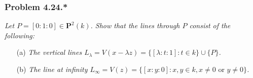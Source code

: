 \documentclass{article}
\begin{document}
\subsubsection*{Problem 4.24.*}
\emph{Let $P = [0 : 1 : 0] \in \mathbf{P}^{2}(k)$.
Show that the lines through $P$ consist of the following:}
\begin{enumerate}
\item[(a)]
  \emph{The vertical lines
  $L_{\lambda} = V(x-\lambda z) = \{ [\lambda:t:1] : t \in k \} \cup \{ P \}$.}

\item[(b)]
  \emph{The line at infinity $L_{\infty} = V(z)
  = \{ [x:y:0] : x,y \in k, x \neq 0 \text{ or } y \neq 0 \}$.} \\
\end{enumerate}
\end{document}
